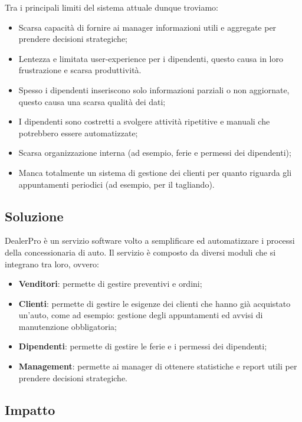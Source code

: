 \documentclass{article}
\begin{document}
  Tra i principali limiti del sistema attuale dunque troviamo:
  \begin{itemize}
    \item Scarsa capacità di fornire ai manager informazioni utili e aggregate per prendere decisioni strategiche;
    \item Lentezza e limitata user-experience per i dipendenti, questo causa in loro frustrazione e scarsa produttività. 
    \item Spesso i dipendenti inseriscono solo informazioni parziali o non aggiornate, questo causa una scarsa qualità dei dati;
    \item I dipendenti sono costretti a svolgere attività ripetitive e manuali che potrebbero essere automatizzate;
    \item Scarsa organizzazione interna (ad esempio, ferie e permessi dei dipendenti);
    \item Manca totalmente un sistema di gestione dei clienti per quanto riguarda gli appuntamenti periodici 
    (ad esempio, per il tagliando).
  \end{itemize}

  \subsection{Soluzione}

  DealerPro è un servizio software volto a semplificare ed automatizzare i processi della concessionaria di auto.
    Il servizio è composto da diversi moduli che si integrano tra loro, ovvero:
    \begin{itemize}
      \item \textbf{Venditori}: permette di gestire preventivi e ordini;
      \item \textbf{Clienti}: permette di gestire le esigenze dei clienti che hanno già acquistato un'auto, 
      come ad esempio: gestione degli appuntamenti ed avvisi di manutenzione obbligatoria;
      \item \textbf{Dipendenti}: permette di gestire le ferie e i permessi dei dipendenti;
      \item \textbf{Management}: permette ai manager di ottenere statistiche e report utili 
        per prendere decisioni strategiche.
    \end{itemize}

  \subsection{Impatto}
  
\end{document}
